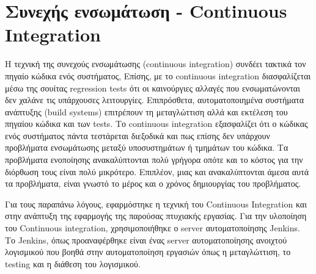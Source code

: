 \documentclass[oneside, 12pt]{book}
\begin{document}
\section{Συνεχής ενσωμάτωση - Continuous Integration}
Η τεχνική της συνεχούς ενσωμάτωσης (continuous integration) συνδέει 
τακτικά τον πηγαίο κώδικα ενός συστήματος,
Επίσης, με το continuous integration διασφαλίζεται μέσω της σουίτας 
regression tests ότι οι καινούργιες αλλαγές που ενσωματώνονται δεν χαλάνε τις υπάρχουσες λειτουργίες.
Επιπρόσθετα, αυτοματοποιημένα συστήματα ανάπτυξης (build systems) 
 επιτρέπουν τη μεταγλώττιση αλλά και εκτέλεση του 
πηγαίου κώδικα και των tests.
Το continuous integration εξασφαλίζει ότι ο κώδικας ενός συστήματος 
πάντα τεστάρεται διεξοδικά και πως επίσης δεν υπάρχουν προβλήματα 
ενσωμάτωσης μεταξύ υποσυστημάτων ή τμημάτων του κώδικα.
Τα προβλήματα ενοποίησης ανακαλύπτονται πολύ γρήγορα οπότε και το 
κόστος για την διόρθωση τους είναι πολύ μικρότερο.
Επιπλέον, μιας και ανακαλύπτονται άμεσα αυτά τα προβλήματα, είναι γνωστό το μέρος και ο χρόνος δημιουργίας του προβλήματος.
\cite{karlesky2008agile}

Για τους παραπάνω λόγους, εφαρμόστηκε η τεχνική του Continuous 
Integration και στην ανάπτυξη της εφαρμογής της παρούσας πτυχιακής 
εργασίας.
Για την υλοποίηση του Continuous integration, χρησιμοποιήθηκε ο server αυτοματοποίησης Jenkins.
Το Jenkins, όπως προαναφέρθηκε είναι ένας server αυτοματοποίησης 
ανοιχτού λογισμικού που βοηθά στην αυτοματοποίηση εργασιών όπως η μεταγλώττιση, το testing και η διάθεση του λογισμικού.
\end{document}
